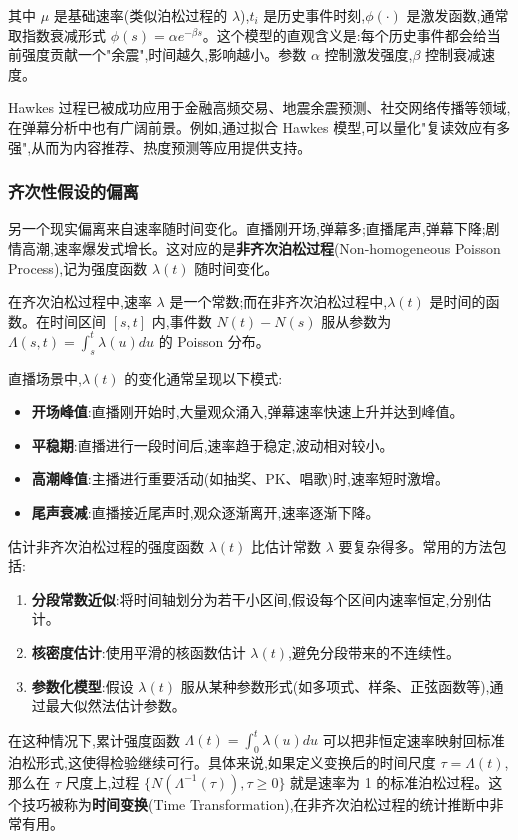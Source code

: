 \documentclass[12pt,a4paper]{article}
\begin{document}
其中 $\mu$ 是基础速率(类似泊松过程的 $\lambda$),$t_i$ 是历史事件时刻,$\phi(\cdot)$ 是激发函数,通常取指数衰减形式 $\phi(s) = \alpha e^{-\beta s}$。这个模型的直观含义是:每个历史事件都会给当前强度贡献一个"余震",时间越久,影响越小。参数 $\alpha$ 控制激发强度,$\beta$ 控制衰减速度。

Hawkes 过程已被成功应用于金融高频交易、地震余震预测、社交网络传播等领域,在弹幕分析中也有广阔前景。例如,通过拟合 Hawkes 模型,可以量化"复读效应有多强",从而为内容推荐、热度预测等应用提供支持。

\subsubsection{齐次性假设的偏离}

另一个现实偏离来自速率随时间变化。直播刚开场,弹幕多;直播尾声,弹幕下降;剧情高潮,速率爆发式增长。这对应的是\textbf{非齐次泊松过程}(Non-homogeneous Poisson Process),记为强度函数 $\lambda(t)$ 随时间变化。

在齐次泊松过程中,速率 $\lambda$ 是一个常数;而在非齐次泊松过程中,$\lambda(t)$ 是时间的函数。在时间区间 $[s,t]$ 内,事件数 $N(t)-N(s)$ 服从参数为 $\Lambda(s,t) = \int_s^t \lambda(u)du$ 的 Poisson 分布。

直播场景中,$\lambda(t)$ 的变化通常呈现以下模式:
\begin{itemize}
\item \textbf{开场峰值}:直播刚开始时,大量观众涌入,弹幕速率快速上升并达到峰值。
\item \textbf{平稳期}:直播进行一段时间后,速率趋于稳定,波动相对较小。
\item \textbf{高潮峰值}:主播进行重要活动(如抽奖、PK、唱歌)时,速率短时激增。
\item \textbf{尾声衰减}:直播接近尾声时,观众逐渐离开,速率逐渐下降。
\end{itemize}

估计非齐次泊松过程的强度函数 $\lambda(t)$ 比估计常数 $\lambda$ 要复杂得多。常用的方法包括:
\begin{enumerate}
\item \textbf{分段常数近似}:将时间轴划分为若干小区间,假设每个区间内速率恒定,分别估计。
\item \textbf{核密度估计}:使用平滑的核函数估计 $\lambda(t)$,避免分段带来的不连续性。
\item \textbf{参数化模型}:假设 $\lambda(t)$ 服从某种参数形式(如多项式、样条、正弦函数等),通过最大似然法估计参数。
\end{enumerate}

在这种情况下,累计强度函数 $\Lambda(t) = \int_0^t \lambda(u)du$ 可以把非恒定速率映射回标准泊松形式,这使得检验继续可行。具体来说,如果定义变换后的时间尺度 $\tau = \Lambda(t)$,那么在 $\tau$ 尺度上,过程 $\{N(\Lambda^{-1}(\tau)), \tau \geq 0\}$ 就是速率为 1 的标准泊松过程。这个技巧被称为\textbf{时间变换}(Time Transformation),在非齐次泊松过程的统计推断中非常有用。
\end{document}
